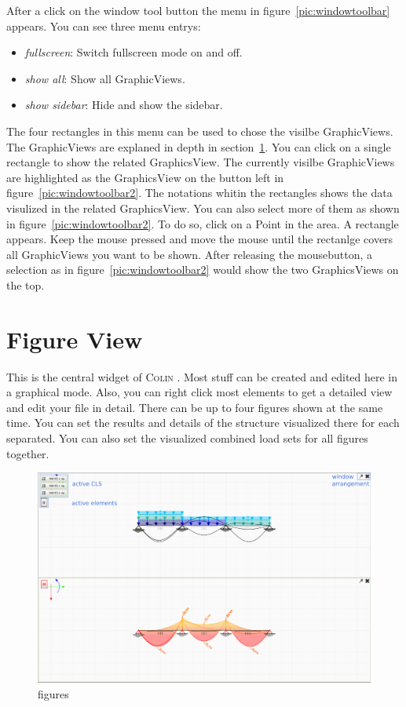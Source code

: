 \documentclass[a4paper,11pt]{report}
\newcommand{\Colin}[0]{\textsc{Colin }}
\begin{document}
\begin{minipage}[h]{\textwidth-7cm}
After a click on the window tool button the menu in figure~\ref{pic:windowtoolbar} appears. You can see three menu entrys:
\begin{itemize}
	\item \textit{fullscreen}: Switch fullscreen mode on and off.
	\item \textit{show all}: Show all GraphicViews.
	\item \textit{show sidebar}: Hide and show the sidebar.
\end{itemize}
The four rectangles in this menu can be used to chose the visilbe GraphicViews. The GraphicViews are explaned in depth in section~\ref{sec:graphical}. You can click on a single rectangle to show the related GraphicsView. The currently visilbe GraphicViews are highlighted as the GraphicsView on the button left in figure~\ref{pic:windowtoolbar2}. The notations whitin the rectangles shows the data visulized in the related GraphicsView. You can also select more of them as shown in figure~\ref{pic:windowtoolbar2}. To do so, click on a Point in the area. A rectangle appears. Keep the mouse pressed and move the mouse until the rectanlge covers all GraphicViews you want to be shown. After releasing the mousebutton, a selection as in figure~\ref{pic:windowtoolbar2} would show the two GraphicsViews on the top. 
\end{minipage}


\section{Figure View}
\label{sec:graphical}

This is the central widget of \Colin. Most stuff can be created and edited here in a graphical mode. Also, you can right click most elements to get a detailed view and edit your file in detail. There can be up to four figures shown at the same time. You can set the results and details of the structure visualized there for each separated. You can also set the visualized combined load sets for all figures together.

\begin{figure}[H]
\begin{center}
\includegraphics[width=\textwidth]{../pictures/figure_main.png}
\caption{figures}
\label{pic:figure_main}
\end{center}
\end{figure}
\end{document}
